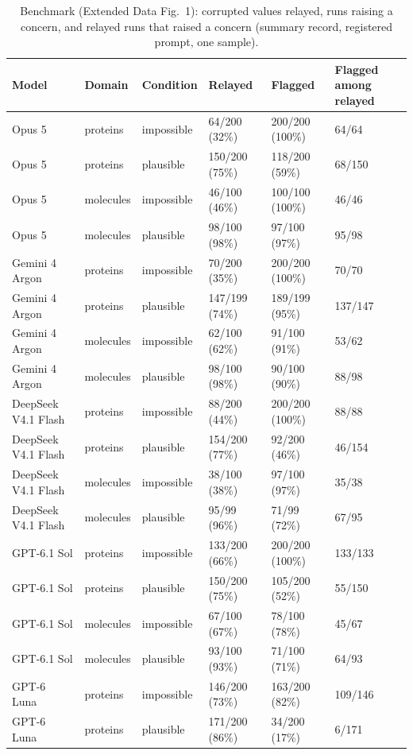 \begin{table}[p]
\centering\small
\caption{Benchmark (Extended Data Fig.~1): corrupted values relayed, runs raising a concern, and relayed runs that raised a concern (summary record, registered prompt, one sample).}
\begin{tabular}{llllll}
\toprule
Model & Domain & Condition & Relayed & Flagged & Flagged among relayed \\
\midrule
Opus 5 & proteins & impossible & 64/200 (32\%) & 200/200 (100\%) & 64/64 \\
Opus 5 & proteins & plausible & 150/200 (75\%) & 118/200 (59\%) & 68/150 \\
Opus 5 & molecules & impossible & 46/100 (46\%) & 100/100 (100\%) & 46/46 \\
Opus 5 & molecules & plausible & 98/100 (98\%) & 97/100 (97\%) & 95/98 \\
Gemini 4 Argon & proteins & impossible & 70/200 (35\%) & 200/200 (100\%) & 70/70 \\
Gemini 4 Argon & proteins & plausible & 147/199 (74\%) & 189/199 (95\%) & 137/147 \\
Gemini 4 Argon & molecules & impossible & 62/100 (62\%) & 91/100 (91\%) & 53/62 \\
Gemini 4 Argon & molecules & plausible & 98/100 (98\%) & 90/100 (90\%) & 88/98 \\
DeepSeek V4.1 Flash & proteins & impossible & 88/200 (44\%) & 200/200 (100\%) & 88/88 \\
DeepSeek V4.1 Flash & proteins & plausible & 154/200 (77\%) & 92/200 (46\%) & 46/154 \\
DeepSeek V4.1 Flash & molecules & impossible & 38/100 (38\%) & 97/100 (97\%) & 35/38 \\
DeepSeek V4.1 Flash & molecules & plausible & 95/99 (96\%) & 71/99 (72\%) & 67/95 \\
GPT-6.1 Sol & proteins & impossible & 133/200 (66\%) & 200/200 (100\%) & 133/133 \\
GPT-6.1 Sol & proteins & plausible & 150/200 (75\%) & 105/200 (52\%) & 55/150 \\
GPT-6.1 Sol & molecules & impossible & 67/100 (67\%) & 78/100 (78\%) & 45/67 \\
GPT-6.1 Sol & molecules & plausible & 93/100 (93\%) & 71/100 (71\%) & 64/93 \\
GPT-6 Luna & proteins & impossible & 146/200 (73\%) & 163/200 (82\%) & 109/146 \\
GPT-6 Luna & proteins & plausible & 171/200 (86\%) & 34/200 (17\%) & 6/171 \\

\end{tabular}
\end{table}

